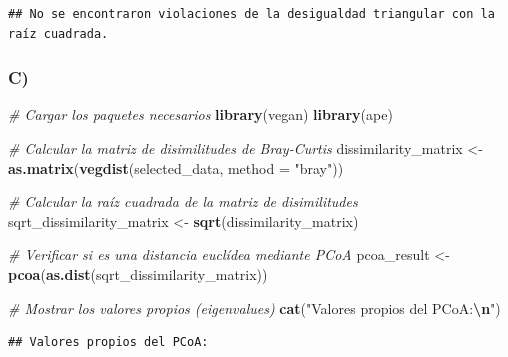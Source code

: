 \documentclass[
]{article}
\newenvironment{Shaded}{\begin{snugshade}}{\end{snugshade}}
\newcommand{\AttributeTok}[1]{\textcolor[rgb]{0.13,0.29,0.53}{#1}}
\newcommand{\CommentTok}[1]{\textcolor[rgb]{0.56,0.35,0.01}{\textit{#1}}}
\newcommand{\FunctionTok}[1]{\textcolor[rgb]{0.13,0.29,0.53}{\textbf{#1}}}
\newcommand{\NormalTok}[1]{#1}
\newcommand{\OtherTok}[1]{\textcolor[rgb]{0.56,0.35,0.01}{#1}}
\newcommand{\SpecialCharTok}[1]{\textcolor[rgb]{0.81,0.36,0.00}{\textbf{#1}}}
\newcommand{\StringTok}[1]{\textcolor[rgb]{0.31,0.60,0.02}{#1}}
\begin{document}
\begin{verbatim}
## No se encontraron violaciones de la desigualdad triangular con la raíz cuadrada.
\end{verbatim}

\hypertarget{c-1}{%
\subsubsection{C)}\label{c-1}}

\begin{Shaded}
\begin{Highlighting}[]
\CommentTok{\# Cargar los paquetes necesarios}
\FunctionTok{library}\NormalTok{(vegan)}
\FunctionTok{library}\NormalTok{(ape)}

\CommentTok{\# Calcular la matriz de disimilitudes de Bray{-}Curtis}
\NormalTok{dissimilarity\_matrix }\OtherTok{\textless{}{-}} \FunctionTok{as.matrix}\NormalTok{(}\FunctionTok{vegdist}\NormalTok{(selected\_data, }\AttributeTok{method =} \StringTok{"bray"}\NormalTok{))}

\CommentTok{\# Calcular la raíz cuadrada de la matriz de disimilitudes}
\NormalTok{sqrt\_dissimilarity\_matrix }\OtherTok{\textless{}{-}} \FunctionTok{sqrt}\NormalTok{(dissimilarity\_matrix)}

\CommentTok{\# Verificar si es una distancia euclídea mediante PCoA}
\NormalTok{pcoa\_result }\OtherTok{\textless{}{-}} \FunctionTok{pcoa}\NormalTok{(}\FunctionTok{as.dist}\NormalTok{(sqrt\_dissimilarity\_matrix))}

\CommentTok{\# Mostrar los valores propios (eigenvalues)}
\FunctionTok{cat}\NormalTok{(}\StringTok{"Valores propios del PCoA:}\SpecialCharTok{\textbackslash{}n}\StringTok{"}\NormalTok{)}
\end{Highlighting}
\end{Shaded}

\begin{verbatim}
## Valores propios del PCoA:
\end{verbatim}

\begin{Shaded}
\end{Shaded}
\end{document}

